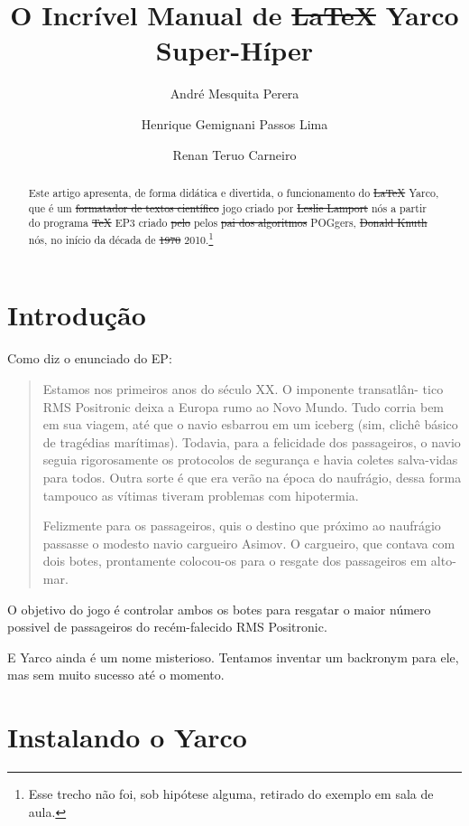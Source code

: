 \documentclass[10pt,brazil]{article}
\title{O Incrível Manual de \sout{LaTeX} Yarco Super-Híper}
\author{André Mesquita Perera \and Henrique Gemignani Passos Lima \and Renan Teruo Carneiro}
\begin{document}

\maketitle

\begin{abstract}

Este artigo apresenta, de forma didática e divertida, o funcionamento
do \sout{\LaTeX} Yarco, que é um \sout{formatador de textos científico} jogo criado por \sout{Leslie
Lamport} nós a partir do programa \sout{\TeX} EP3 criado \sout{pelo} pelos \sout{pai dos algoritmos} POGgers,
\sout{Donald Knuth} nós, no início da década de \sout{1970} 2010.\footnote{Esse trecho não foi, sob hipótese alguma,
retirado do exemplo em sala de aula.}

\end{abstract}

\section{Introdução}

Como diz o enunciado do EP:

\begin{quote}
Estamos nos primeiros anos do século XX. O imponente transatlân- tico RMS Positronic deixa a Europa rumo ao Novo Mundo.
 Tudo corria bem em sua viagem, até que o navio esbarrou em um iceberg (sim, clichê básico de tragédias marítimas).
 Todavia, para a felicidade dos passageiros, o navio seguia rigorosamente os protocolos de segurança e havia coletes
 salva-vidas para todos. Outra sorte é que era verão na época do naufrágio, dessa forma tampouco as vítimas tiveram
 problemas com hipotermia.

Felizmente para os passageiros, quis o destino que próximo ao naufrágio passasse o modesto navio cargueiro Asimov. O cargueiro, que contava com dois botes, prontamente colocou-os para o resgate dos passageiros em alto-mar.
\end{quote}

O objetivo do jogo é controlar ambos os botes para resgatar o maior número possivel de passageiros do
recém-falecido RMS Positronic.

E Yarco ainda é um nome misterioso. Tentamos inventar um backronym para ele, mas sem muito sucesso até o momento.

\section{Instalando o Yarco}
\end{document}
